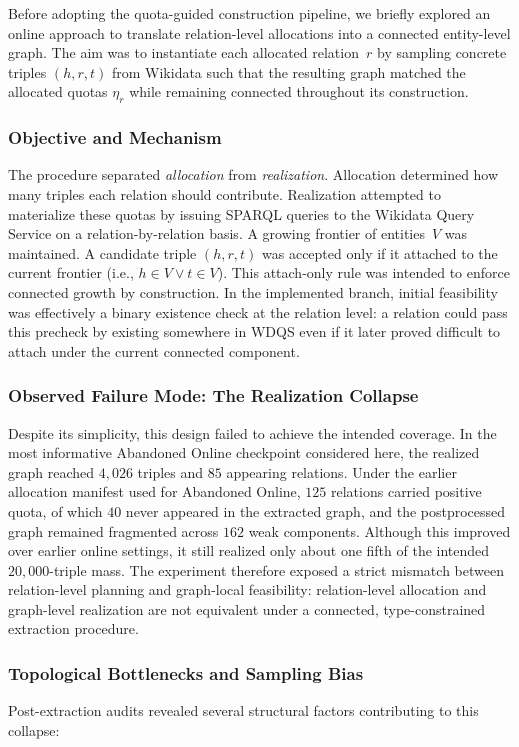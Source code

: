\documentclass[12pt,a4paper]{article}
\begin{document}
Before adopting the quota-guided construction pipeline, we briefly explored an online approach to translate relation-level allocations into a connected entity-level graph. The aim was to instantiate each allocated relation~$r$ by sampling concrete triples $(h,r,t)$ from Wikidata such that the resulting graph matched the allocated quotas \(\eta_r\) while remaining connected throughout its construction.

\subsubsection{Objective and Mechanism}
The procedure separated \emph{allocation} from \emph{realization}. Allocation determined how many triples each relation should contribute. Realization attempted to materialize these quotas by issuing SPARQL queries to the Wikidata Query Service on a relation-by-relation basis. A growing frontier of entities~$V$ was maintained. A candidate triple \((h,r,t)\) was accepted only if it attached to the current frontier (i.e., $h \in V \lor t \in V$). This attach-only rule was intended to enforce connected growth by construction. In the implemented branch, initial feasibility was effectively a binary existence check at the relation level: a relation could pass this precheck by existing somewhere in WDQS even if it later proved difficult to attach under the current connected component.


\subsubsection{Observed Failure Mode: The Realization Collapse}
Despite its simplicity, this design failed to achieve the intended coverage. In the most informative Abandoned Online checkpoint considered here, the realized graph reached \(4{,}026\) triples and \(85\) appearing relations. Under the earlier allocation manifest used for Abandoned Online, \(125\) relations carried positive quota, of which \(40\) never appeared in the extracted graph, and the postprocessed graph remained fragmented across \(162\) weak components. Although this improved over earlier online settings, it still realized only about one fifth of the intended \(20{,}000\)-triple mass. The experiment therefore exposed a strict mismatch between relation-level planning and graph-local feasibility: relation-level allocation and graph-level realization are not equivalent under a connected, type-constrained extraction procedure.

\subsubsection{Topological Bottlenecks and Sampling Bias}
Post-extraction audits revealed several structural factors contributing to this collapse:
\end{document}
